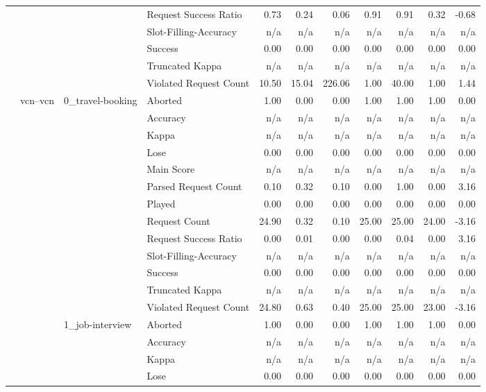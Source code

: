 \begin{tabular}{llllrrrrrrr}
 &  &  & Request Success Ratio & 0.73 & 0.24 & 0.06 & 0.91 & 0.91 & 0.32 & -0.68 \\
 &  &  & Slot-Filling-Accuracy & n/a & n/a & n/a & n/a & n/a & n/a & n/a \\
 &  &  & Success & 0.00 & 0.00 & 0.00 & 0.00 & 0.00 & 0.00 & 0.00 \\
 &  &  & Truncated Kappa & n/a & n/a & n/a & n/a & n/a & n/a & n/a \\
 &  &  & Violated Request Count & 10.50 & 15.04 & 226.06 & 1.00 & 40.00 & 1.00 & 1.44 \\
\cline{2-11} \cline{3-11}
 & \multirow[t]{66}{*}{vcn--vcn} & \multirow[t]{13}{*}{0_travel-booking} & Aborted & 1.00 & 0.00 & 0.00 & 1.00 & 1.00 & 1.00 & 0.00 \\
 &  &  & Accuracy & n/a & n/a & n/a & n/a & n/a & n/a & n/a \\
 &  &  & Kappa & n/a & n/a & n/a & n/a & n/a & n/a & n/a \\
 &  &  & Lose & 0.00 & 0.00 & 0.00 & 0.00 & 0.00 & 0.00 & 0.00 \\
 &  &  & Main Score & n/a & n/a & n/a & n/a & n/a & n/a & n/a \\
 &  &  & Parsed Request Count & 0.10 & 0.32 & 0.10 & 0.00 & 1.00 & 0.00 & 3.16 \\
 &  &  & Played & 0.00 & 0.00 & 0.00 & 0.00 & 0.00 & 0.00 & 0.00 \\
 &  &  & Request Count & 24.90 & 0.32 & 0.10 & 25.00 & 25.00 & 24.00 & -3.16 \\
 &  &  & Request Success Ratio & 0.00 & 0.01 & 0.00 & 0.00 & 0.04 & 0.00 & 3.16 \\
 &  &  & Slot-Filling-Accuracy & n/a & n/a & n/a & n/a & n/a & n/a & n/a \\
 &  &  & Success & 0.00 & 0.00 & 0.00 & 0.00 & 0.00 & 0.00 & 0.00 \\
 &  &  & Truncated Kappa & n/a & n/a & n/a & n/a & n/a & n/a & n/a \\
 &  &  & Violated Request Count & 24.80 & 0.63 & 0.40 & 25.00 & 25.00 & 23.00 & -3.16 \\
\cline{3-11}
 &  & \multirow[t]{13}{*}{1_job-interview} & Aborted & 1.00 & 0.00 & 0.00 & 1.00 & 1.00 & 1.00 & 0.00 \\
 &  &  & Accuracy & n/a & n/a & n/a & n/a & n/a & n/a & n/a \\
 &  &  & Kappa & n/a & n/a & n/a & n/a & n/a & n/a & n/a \\
 &  &  & Lose & 0.00 & 0.00 & 0.00 & 0.00 & 0.00 & 0.00 & 0.00 \\

\end{tabular}
